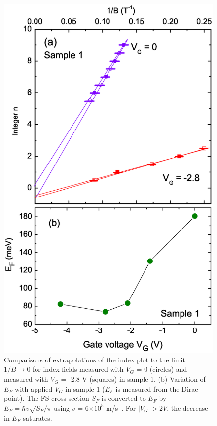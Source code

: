\begin{figure}[!htbp]
  \begin{center}
\includegraphics[width=0.85\linewidth]{ch-liquid/figures/FigIndexError.eps}
\caption{\label{figIndexError} 
Comparisons of extrapolations of the index plot to the limit $1/B \to 0$ for index fields measured with $V_G$ = 0 (circles) and measured with $V_G$ = -2.8 V (squares) in sample 1. (b) Variation of $E_F$ with applied $V_G$ in sample 1 ($E_F$ is measured from the Dirac point). The FS cross-section $S_F$ is converted to $E_F$ by $E_F = \hbar v\sqrt{S_F/\pi}$ 
using $v$ = 6$\times 10^5$ m/s~\cite{Xiong2012}. For $|V_G|> 2 V$, the decrease in $E_F$ saturates.
} 
  \end{center}
\end{figure} 


